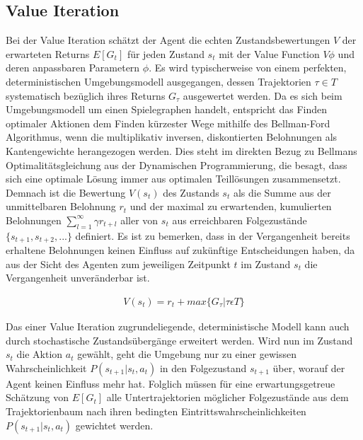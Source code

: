 \subsection{Value Iteration}
Bei der Value Iteration schätzt der Agent die echten Zustandsbewertungen $V$ der erwarteten
Returns $E[G_t]$ für jeden Zustand $s_t$ mit der Value Function $V\phi$ und deren
anpassbaren Parametern $\phi$. Es wird typischerweise von einem perfekten, deterministischen
Umgebungsmodell ausgegangen, dessen Trajektorien $\tau \in T$ systematisch bezüglich
ihres Returns $G_\tau$ ausgewertet werden. Da es sich beim Umgebungsmodell um einen Spielegraphen
handelt, entspricht das Finden optimaler Aktionen dem Finden kürzester Wege mithilfe
des Bellman-Ford Algorithmus, wenn die multiplikativ inversen, diskontierten Belohnungen
als Kantengewichte herangezogen werden. Dies steht im direkten Bezug zu Bellmans
Optimalitätsgleichung aus der Dynamischen Programmierung, die besagt, dass sich eine
optimale Lösung immer aus optimalen Teillösungen zusammensetzt. Demnach ist die Bewertung
$V(s_t)$ des Zustands $s_t$ als die Summe aus der unmittelbaren Belohnung $r_t$ und
der maximal zu erwartenden, kumulierten Belohnungen $\sum_{l=1}^\infty \gamma r_{t+l}$
aller von $s_t$ aus erreichbaren Folgezustände $\{ s_{t+1}, s_{t+2}, ... \}$ definiert.
Es ist zu bemerken, dass in der Vergangenheit bereits erhaltene Belohnungen keinen Einfluss
auf zukünftige Entscheidungen haben, da aus der Sicht des Agenten zum jeweiligen Zeitpunkt
$t$ im Zustand $s_t$ die Vergangenheit unveränderbar ist.

\begin{equation}
\begin{aligned}
V(s_t) = r_t + max \{ G_\tau | \tau \epsilon T \}
\end{aligned}
\end{equation}

Das einer Value Iteration zugrundeliegende, deterministische Modell kann auch durch
stochastische Zustandsübergänge erweitert werden. Wird nun im Zustand $s_t$ die
Aktion $a_t$ gewählt, geht die Umgebung nur zu einer gewissen Wahrscheinlichkeit
$P(s_{t+1} | s_t, a_t)$ in den Folgezustand $s_{t+1}$ über, worauf der Agent keinen
Einfluss mehr hat. Folglich müssen für eine erwartungsgetreue Schätzung von $E[G_t]$
alle Untertrajektorien möglicher Folgezustände aus dem Trajektorienbaum nach ihren
bedingten Eintrittswahrscheinlichkeiten $P(s_{t+1} | s_t, a_t)$ gewichtet werden.\\

